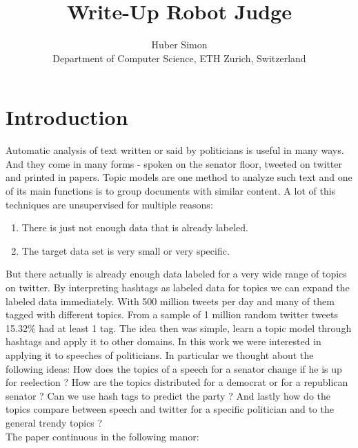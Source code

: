 \documentclass[10pt,conference,compsocconf]{IEEEtran}
\begin{document}
\title{Write-Up Robot Judge}

\author{
  Huber Simon\\
  Department of Computer Science, ETH Zurich, Switzerland
}

\maketitle

\begin{abstract}

\end{abstract}

\section{Introduction}
Automatic analysis of text written or said by politicians is useful in many ways. And they come in many forms - spoken on the senator floor, tweeted on twitter and printed in papers. 
Topic models are one method to analyze such text and one of its main functions is to group documents with similar content. A lot of this techniques are unsupervised for multiple reasons: \begin{enumerate}
	\item There is just not enough data that is already labeled. 
	\item The target data set is very small or very specific. 
\end{enumerate} 
But there actually is already enough data labeled for a very wide range of topics on twitter. By interpreting hashtags as labeled data for topics we can expand the labeled data immediately. With 500 million tweets per day \cite{twitter_stats} and many of them tagged with different topics. From a sample of 1 million random twitter tweets 15.32\% had at least 1 tag. The idea then was simple, learn a topic model through hashtags and apply it to other domains. In this work we were interested in applying it to speeches of politicians. In particular we thought about the following ideas: How does the topics of a speech for a senator change if he is up for reelection ? How are the topics distributed for a democrat or for a republican senator ? Can we use hash tags to predict the party ? And lastly how do the topics compare between speech and twitter for a specific politician and to the general trendy topics ? \\
The paper continuous in the following manor: 
\end{document}
